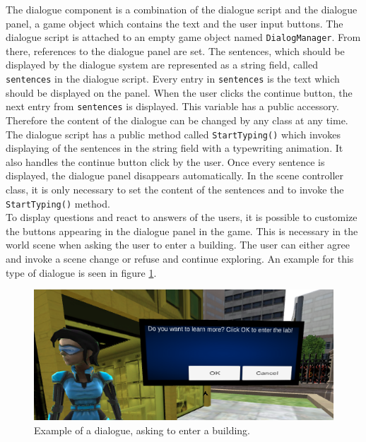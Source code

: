 The dialogue component is a combination of the dialogue script and the dialogue panel, a game object which contains the text and the user input buttons. The dialogue script is attached to an empty game object named \texttt{DialogManager}. From there, references to the dialogue panel are set. The sentences, which should be displayed by the dialogue system are represented as a string field, called \texttt{sentences} in the dialogue script. Every entry in \texttt{sentences} is the text which should be displayed on the panel. When the user clicks the continue button, the next entry from \texttt{sentences} is displayed. This variable has a public accessory. Therefore the content of the dialogue can be changed by any class at any time. \\
The dialogue script has a public method called \texttt{StartTyping()} which invokes displaying of the sentences in the string field with a typewriting animation. It also handles the continue button click by the user. Once every sentence is displayed, the dialogue panel disappears automatically. In the scene controller class, it is only necessary to set the content of the sentences and to invoke the \texttt{StartTyping()} method.\\
To display questions and react to answers of the users, it is possible to customize the buttons appearing in the dialogue panel in the game. This is necessary in the world scene when asking the user to enter a building. The user can either agree and invoke a scene change or refuse and continue exploring. An example for this type of dialogue is seen in figure \ref{fig:question-dialog}.
\begin{figure}[h]
  \includegraphics[width=14cm]{kapitel/software-dialog-question.PNG}
  \centering
  \caption{Example of a dialogue, asking to enter a building.}
  \label{fig:question-dialog}
\end{figure}
